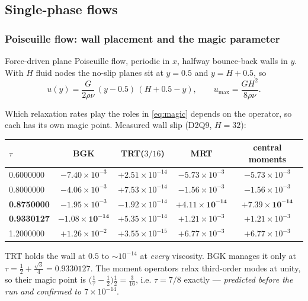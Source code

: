 \documentclass[11pt,a4paper]{article}
\begin{document}
\subsection{Single-phase flows}
\label{sec:val:single}
\subsubsection{Poiseuille flow: wall placement and the magic parameter}
\label{sec:poiseuille}

Force-driven plane Poiseuille flow, periodic in $x$, halfway bounce-back walls in
$y$. With $H$ fluid nodes the no-slip planes sit at $y=0.5$ and $y=H+0.5$, so
\begin{equation}
  u(y) = \frac{G}{2\rho\nu}\,(y-0.5)\,(H+0.5-y),
  \qquad u_{\max} = \frac{GH^2}{8\rho\nu}.
\end{equation}

Which relaxation rates play the roles in \eqref{eq:magic} depends on the operator,
so each has its own magic point. Measured wall slip (D2Q9, $H=32$):

\begin{center}\small
\begin{tabular}{lcccc}
\toprule
$\tau$ & BGK & TRT($3/16$) & MRT & central moments \\
\midrule
0.6000000 & $-7.40\times10^{-3}$ & $+2.51\times10^{-14}$ & $-5.73\times10^{-3}$ & $-5.73\times10^{-3}$ \\
0.8000000 & $-4.06\times10^{-3}$ & $+7.53\times10^{-14}$ & $-1.56\times10^{-3}$ & $-1.56\times10^{-3}$ \\
\textbf{0.8750000} & $-1.95\times10^{-3}$ & $-1.92\times10^{-14}$ & $\bm{+4.11\times10^{-14}}$ & $\bm{+7.39\times10^{-14}}$ \\
\textbf{0.9330127} & $\bm{-1.08\times10^{-14}}$ & $+5.35\times10^{-14}$ & $+1.21\times10^{-3}$ & $+1.21\times10^{-3}$ \\
1.2000000 & $+1.26\times10^{-2}$ & $+3.55\times10^{-15}$ & $+6.77\times10^{-3}$ & $+6.77\times10^{-3}$ \\
\bottomrule
\end{tabular}
\end{center}

\noindent TRT holds the wall at $0.5$ to $\sim10^{-14}$ at \emph{every} viscosity.
BGK manages it only at $\tau=\tfrac12+\tfrac{\sqrt3}{4}=0.9330127$. The moment
operators relax third-order modes at unity, so their magic point is
$\big(\tfrac{1}{\tau}-\tfrac12\big)\tfrac12=\tfrac{3}{16}$, i.e.
$\tau=7/8$ exactly --- \emph{predicted before the run and confirmed to
$7\times10^{-14}$}.
\end{document}
